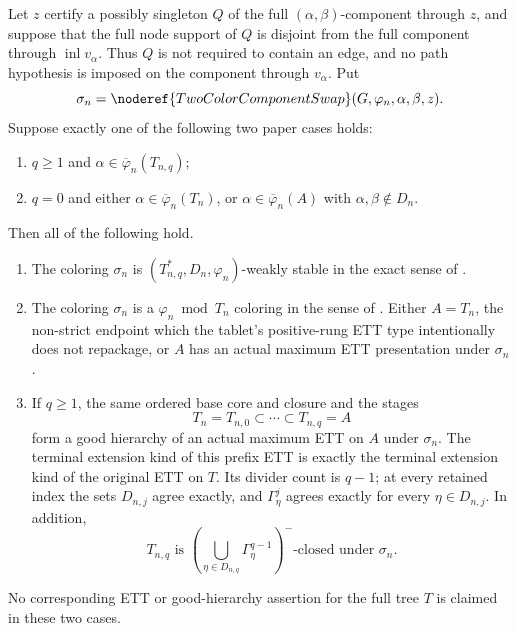 \begin{lemma}
Let $z$ certify a possibly singleton
 $Q$ of the full
$(\alpha,\beta)$-component through $z$, and suppose that the full node
support of $Q$ is disjoint from the full component through
$\operatorname{inl}v_\alpha$.  Thus $Q$ is not required to contain an
edge, and no path hypothesis is imposed on the component through
$v_\alpha$.  Put
\[
 \sigma_n=\noderef{TwoColorComponentSwap}
       (G,\varphi_n,\alpha,\beta,z).
\]
Suppose exactly one of the following two paper cases holds:
\begin{enumerate}
\item $q\geq1$ and $\alpha\in\overline\varphi_n(T_{n,q})$;
\item $q=0$ and either
$\alpha\in\overline\varphi_n(T_n)$, or
$\alpha\in\overline\varphi_n(A)$ with
$\alpha,\beta\notin D_n$.
\end{enumerate}
Then all of the following hold.
\begin{enumerate}
\item The coloring $\sigma_n$ is
$(T_{n,q}^{*},D_n,\varphi_n)$-weakly stable in the exact sense of
.
\item The coloring $\sigma_n$ is a
$\varphi_n\bmod T_n$ coloring in the sense of .
Either $A=T_n$, the non-strict endpoint which the tablet's positive-rung
ETT type intentionally does not repackage, or $A$ has an actual maximum
ETT presentation under $\sigma_n$.
\item If $q\geq1$, the same ordered base core and closure and the stages
\[
 T_n=T_{n,0}\subset\cdots\subset T_{n,q}=A
\]
form a good hierarchy of an actual maximum ETT on $A$ under
$\sigma_n$.  The terminal extension kind of this prefix ETT is exactly
the terminal extension kind of the original ETT on $T$.  Its divider
count is $q-1$; at every retained index the sets $D_{n,j}$ agree exactly,
and
$\Gamma^j_\eta$ agrees exactly for every $\eta\in D_{n,j}$.  In addition,
\[
 T_{n,q}\text{ is }
 \left(\bigcup_{\eta\in D_{n,q}}\Gamma^{q-1}_\eta\right)^{-}
 \text{-closed under }\sigma_n.                                \tag{M}
\]
\end{enumerate}
No corresponding ETT or good-hierarchy assertion for the full tree $T$
is claimed in these two cases.
\end{lemma}
